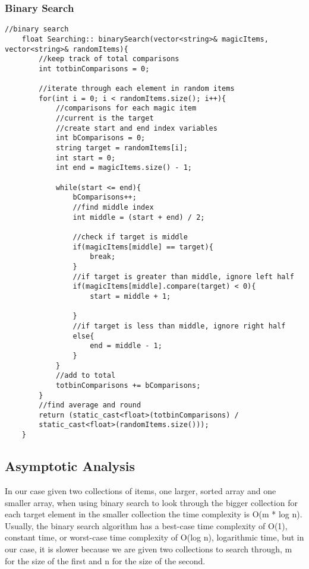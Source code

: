 \documentclass[letterpaper, 10pt,DIV=13]{scrartcl}
\numberwithin{equation}{section} %
\numberwithin{figure}{section} %
\numberwithin{table}{section} %
\begin{document}
\subsubsection*{Binary Search}
    \lstset{numbers=left, numberstyle=\tiny, stepnumber=1, numbersep=5pt, basicstyle=\footnotesize\ttfamily}
    \begin{lstlisting}[frame=single, ]
    //binary search
    float Searching:: binarySearch(vector<string>& magicItems, vector<string>& randomItems){
        //keep track of total comparisons
        int totbinComparisons = 0;
        
        //iterate through each element in random items
        for(int i = 0; i < randomItems.size(); i++){
            //comparisons for each magic item
            //current is the target
            //create start and end index variables
            int bComparisons = 0;
            string target = randomItems[i];
            int start = 0;
            int end = magicItems.size() - 1;
    
            while(start <= end){
                bComparisons++;
                //find middle index
                int middle = (start + end) / 2;
    
                //check if target is middle
                if(magicItems[middle] == target){
                    break;
                }
                //if target is greater than middle, ignore left half
                if(magicItems[middle].compare(target) < 0){
                    start = middle + 1;
    
                }
                //if target is less than middle, ignore right half
                else{
                    end = middle - 1;
                }
            }
            //add to total
            totbinComparisons += bComparisons;
        }
        //find average and round
        return (static_cast<float>(totbinComparisons) / 
        static_cast<float>(randomItems.size()));
    }

\end{lstlisting}

\subsection{Asymptotic Analysis}
In our case given two collections of items, one larger, sorted array and one smaller array, when using binary search to look through the bigger collection for each target element in the smaller collection the time complexity is O(m * log n). Usually, the binary search algorithm has a best-case time complexity of O(1), constant time, or worst-case time complexity of O(log n), logarithmic time, but in our case, it is slower because we are given two collections to search through, m for the size of the first and n for the size of the second.
\end{document}
